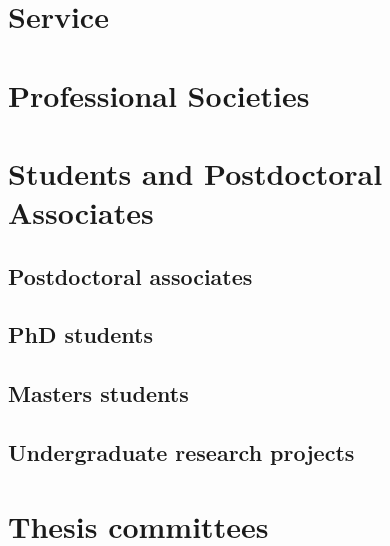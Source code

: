 \documentclass{article}
\begin{document}



\section*{Service}




\section*{Professional Societies}




\section*{Students and Postdoctoral Associates}

\subsection*{Postdoctoral associates}



\subsection*{PhD students}



\subsection*{Masters students}



\subsection*{Undergraduate research projects}




\section*{Thesis committees}
\end{document}
